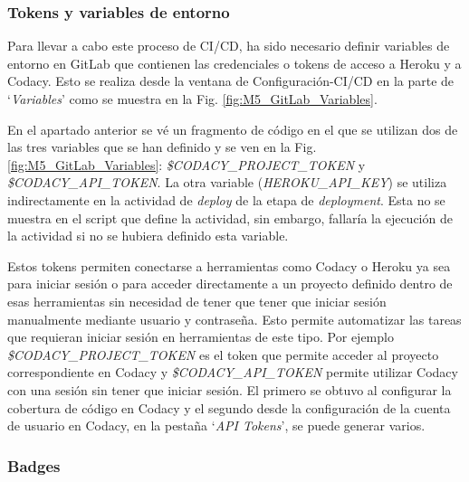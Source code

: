 
\subsubsection{Tokens y variables de entorno}

Para llevar a cabo este proceso de CI/CD, ha sido necesario definir variables de entorno en GitLab que contienen las credenciales o tokens de acceso a Heroku y a Codacy. Esto se realiza desde la ventana de Configuración-CI/CD en la parte de `\textit{Variables}' como se muestra en la Fig. \ref{fig:M5_GitLab_Variables}.


En el apartado anterior se vé un fragmento de código en el que se utilizan dos de las tres variables que se han definido y se ven en la Fig. \ref{fig:M5_GitLab_Variables}: \textit{\$CODACY\_PROJECT\_TOKEN} y \textit{\$CODACY\_API\_TOKEN}. La otra variable (\textit{HEROKU\_API\_KEY}) se utiliza indirectamente en la actividad de \textit{deploy} de la etapa de \textit{deployment}. Esta no se muestra en el script que define la actividad, sin embargo, fallaría la ejecución de la actividad si no se hubiera definido esta variable.

Estos tokens permiten conectarse a herramientas como Codacy o Heroku ya sea para iniciar sesión o para acceder directamente a un proyecto definido dentro de esas herramientas sin necesidad de tener que tener que iniciar sesión manualmente mediante usuario y contraseña. Esto permite automatizar las tareas que requieran iniciar sesión en herramientas de este tipo. Por ejemplo \textit{\$CODACY\_PROJECT\_TOKEN} es el token que permite acceder al proyecto correspondiente en Codacy y \textit{\$CODACY\_API\_TOKEN} permite utilizar Codacy con una sesión sin tener que iniciar sesión. El primero se obtuvo al configurar la cobertura de código en Codacy y el segundo desde la configuración de la cuenta de usuario en Codacy, en la pestaña `\textit{API Tokens}', se puede generar varios.

\subsubsection{Badges}

